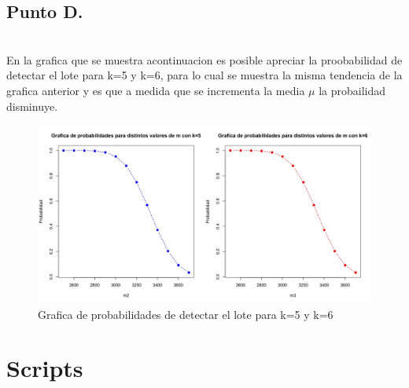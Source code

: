 \documentclass[letterpaper,12pt,onecolumn,titlepage]{article}
\begin{document}
\pagebreak \subsection{Punto D.}
~\\ En la grafica que se muestra acontinuacion es posible apreciar la proobabilidad de detectar el lote para k=5 y k=6, para lo cual se muestra la misma tendencia de la grafica anterior y es que a medida que se incrementa la media $\mu$ la probailidad disminuye.
\begin{figure}[!h]
    \begin{center}
        \includegraphics[width=15cm]{Figuras/5d.jpeg}
        \caption{Grafica de probabilidades de detectar el lote para k=5 y k=6}
        \label{fig:Densidad}
    \end{center}
\end{figure}

\section{Scripts}



\end{document}
